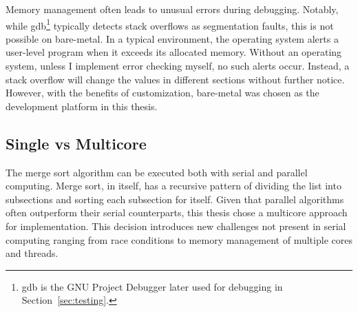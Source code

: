 Memory management often leads to unusual errors during debugging. Notably, while
gdb\footnote{gdb is the GNU Project Debugger later used for debugging in
Section~\ref{sec:testing}.} typically detects stack overflows as segmentation
faults, this is not possible on bare-metal. In a typical environment, the
operating system alerts a user-level program when it exceeds its allocated
memory. Without an operating system, unless I implement error checking myself,
no such alerts occur. Instead, a stack overflow will change the values in
different sections without further notice. However, with the benefits of
customization, bare-metal was chosen as the development platform in this thesis.

\subsection{Single vs Multicore}\label{sec:singlevsmulti}
The merge sort algorithm can be executed both with serial and parallel
computing. Merge sort, in itself, has a recursive pattern of dividing the list
into subsections and sorting each subsection for itself. Given that parallel
algorithms often outperform their serial counterparts, this thesis chose a
multicore approach for implementation\cite{comp_parallel}. This decision
introduces new challenges not present in serial computing ranging from race
conditions to memory management of multiple cores and threads.

